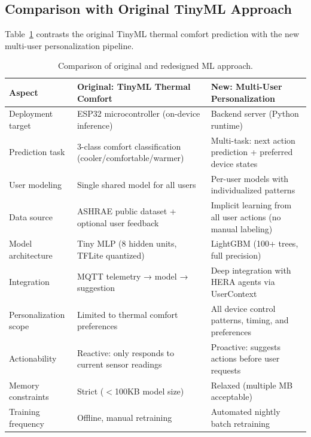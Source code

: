 \subsection{Comparison with Original TinyML Approach}

Table~\ref{tab:old-vs-new} contrasts the original TinyML thermal comfort
prediction with the new multi-user personalization pipeline.

\begin{table}[H]
    \centering
    \caption{Comparison of original and redesigned ML approach.}
    \label{tab:old-vs-new}
    \renewcommand{\arraystretch}{1.2}
    \small
    \begin{tabularx}{\textwidth}{@{} >{\raggedright\arraybackslash}p{3cm} X X @{}}
        \toprule
        \textbf{Aspect} & \textbf{Original: TinyML Thermal Comfort} & \textbf{New: Multi-User Personalization} \\
        \midrule
        Deployment target &
        ESP32 microcontroller (on-device inference) &
        Backend server (Python runtime) \\
        
        Prediction task &
        3-class comfort classification (cooler/comfortable/warmer) &
        Multi-task: next action prediction + preferred device states \\
        
        User modeling &
        Single shared model for all users &
        Per-user models with individualized patterns \\
        
        Data source &
        ASHRAE public dataset + optional user feedback &
        Implicit learning from all user actions (no manual labeling) \\
        
        Model architecture &
        Tiny MLP (8 hidden units, TFLite quantized) &
        LightGBM (100+ trees, full precision) \\
        
        Integration &
        MQTT telemetry → model → suggestion &
        Deep integration with HERA agents via UserContext \\
        
        Personalization scope &
        Limited to thermal comfort preferences &
        All device control patterns, timing, and preferences \\
        
        Actionability &
        Reactive: only responds to current sensor readings &
        Proactive: suggests actions before user requests \\
        
        Memory constraints &
        Strict ($<$100KB model size) &
        Relaxed (multiple MB acceptable) \\
        
        Training frequency &
        Offline, manual retraining &
        Automated nightly batch retraining \\
        \bottomrule
    \end{tabularx}
\end{table}

